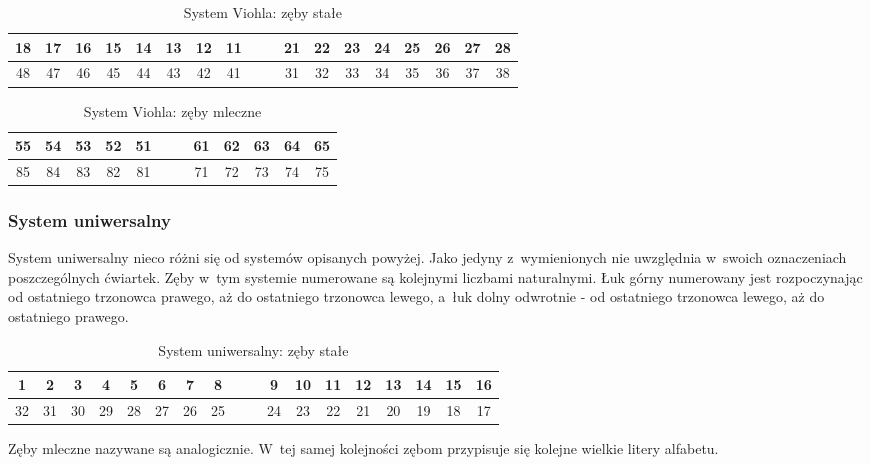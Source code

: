 \begin{table}[h t]
\centering
\begin{tabular}{c c c c c c c c c | c c c c c c c c c}
18 & 17 & 16 & 15 & 14 & 13 & 12 & 11 &&& 21 & 22 & 23 & 24 & 25 & 26 & 27 & 28
\\ [1ex] \hline \rule{0pt}{1.2\normalbaselineskip}
48 & 47 & 46 & 45 & 44 & 43 & 42 & 41 &&& 31 & 32 & 33 & 34 & 35 & 36 & 37 & 38
\end{tabular}
\caption{\label{tab:tab7} System Viohla: zęby stałe}
\end{table}

\begin{table}[h t]
\centering
\begin{tabular}{c c c c c c | c c c c c c}
55 & 54 & 53 & 52 & 51 &&& 61 & 62 & 63 & 64 & 65
\\ [1ex] \hline \rule{0pt}{1.2\normalbaselineskip}
85 & 84 & 83 & 82 & 81 &&& 71 & 72 & 73 & 74 & 75
\end{tabular}
\caption{\label{tab:tab8} System Viohla: zęby mleczne}
\end{table}

\subsubsection{System uniwersalny}

System uniwersalny nieco różni się od systemów opisanych powyżej. Jako jedyny z~wymienionych nie uwzględnia w~swoich oznaczeniach poszczególnych ćwiartek. Zęby w~tym systemie numerowane są kolejnymi liczbami naturalnymi. Łuk górny numerowany jest rozpoczynając od ostatniego trzonowca prawego, aż do ostatniego trzonowca lewego, a~łuk dolny odwrotnie - od ostatniego trzonowca lewego, aż do ostatniego prawego.\\

\begin{table}[h t]
\centering
\begin{tabular}{c c c c c c c c c | c c c c c c c c c}
1 & 2 & 3 & 4 & 5 & 6 & 7 & 8 &&& 9 & 10 & 11 & 12 & 13 & 14 & 15 & 16
\\ [1ex] \hline \rule{0pt}{1.2\normalbaselineskip}
32 & 31 & 30 & 29 & 28 & 27 & 26 & 25 &&& 24 & 23 & 22 & 21 & 20 & 19 & 18 & 17
\end{tabular}
\caption{\label{tab:tab9} System uniwersalny: zęby stałe}
\end{table}

Zęby mleczne nazywane są analogicznie. W~tej samej kolejności zębom przypisuje się kolejne wielkie litery alfabetu.\\

